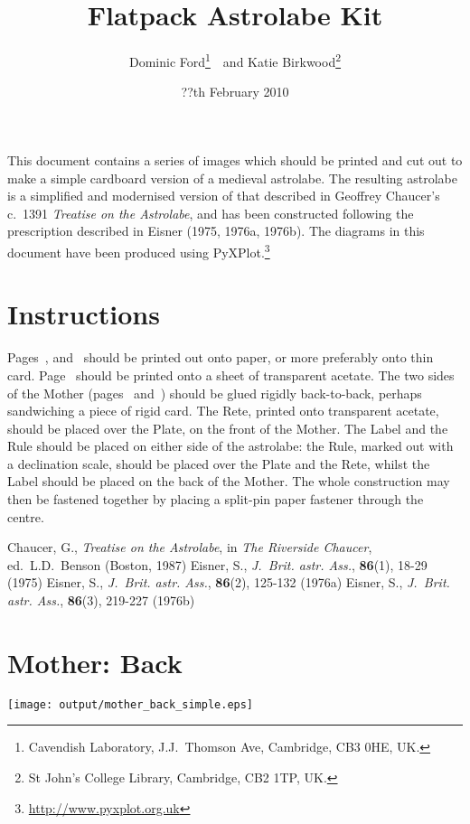\documentclass[a4paper,onecolumn,10pt]{article}
\title{\vspace{-3cm}Flatpack Astrolabe Kit}
\author{Dominic Ford\footnote{Cavendish Laboratory, J.J.\ Thomson Ave, Cambridge, CB3 0HE, UK.}~~and Katie Birkwood\footnote{St John's College Library, Cambridge, CB2 1TP, UK.}}
\date{??th February 2010}
\begin{document}
\maketitle
\setcounter{footnote}{3}

This document contains a series of images which should be printed and cut out
to make a simple cardboard version of a medieval astrolabe. The resulting
astrolabe is a simplified and modernised version of that described in Geoffrey
Chaucer's c.\ 1391 {\it Treatise on the Astrolabe}, and has been constructed
following the prescription described in Eisner (1975, 1976a, 1976b). The
diagrams in this document have been produced using
PyXPlot.\footnote{\url{http://www.pyxplot.org.uk}}

\section*{Instructions}

Pages~\pageref{mother_back}, \pageref{mother_front} and~\pageref{rule} should
be printed out onto paper, or more preferably onto thin card.
Page~\pageref{rete} should be printed onto a sheet of transparent acetate. The
two sides of the Mother (pages~\pageref{mother_back}
and~\pageref{mother_front}) should be glued rigidly back-to-back, perhaps
sandwiching a piece of rigid card.  The Rete, printed onto transparent acetate,
should be placed over the Plate, on the front of the Mother.  The Label and the
Rule should be placed on either side of the astrolabe: the Rule, marked out
with a declination scale, should be placed over the Plate and the Rete, whilst
the Label should be placed on the back of the Mother. The whole construction
may then be fastened together by placing a split-pin paper fastener through the
centre.

\begin{thebibliography}{9}
Chaucer, G., \textit{Treatise on the Astrolabe}, in {\it The Riverside Chaucer}, ed.\ L.D.\ Benson (Boston, 1987)
Eisner, S., \textit{J.\ Brit. astr. Ass.}, \textbf{86}(1), 18-29 (1975)
Eisner, S., \textit{J.\ Brit. astr. Ass.}, \textbf{86}(2), 125-132 (1976a)
Eisner, S., \textit{J.\ Brit. astr. Ass.}, \textbf{86}(3), 219-227 (1976b)
\end{thebibliography}

\newpage
\section*{Mother: Back}
\label{mother_back}
\vspace{-1cm}\centerline{\texttt{[image: output/mother\_back\_simple.eps]}}
\end{document}
